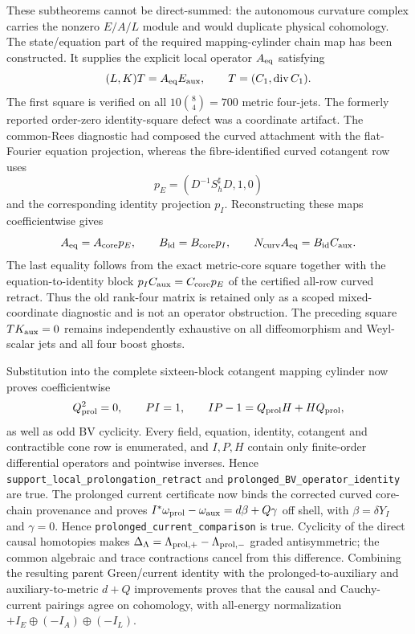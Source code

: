 \documentclass[11pt]{article}
\theoremstyle{definition}
\theoremstyle{remark}
\begin{document}
These subtheorems cannot be direct-summed: the autonomous curvature complex
carries the nonzero $E/A/L$ module and would duplicate physical cohomology.
The state/equation part of the required mapping-cylinder chain map has been
constructed.  It supplies the explicit local operator $A_{\rm eq}$ satisfying
\begin{equation}
 (L,K)T=A_{\rm eq}E_{\rm aux},\qquad
 T=(C_1,\operatorname{div}C_1).
\end{equation}
The first square is verified on all $10\binom{8}{4}=700$ metric four-jets.
The formerly reported order-zero identity-square defect was a coordinate
artifact.  The common-Rees diagnostic had composed the curved attachment with
the flat-Fourier equation projection, whereas the fibre-identified curved
cotangent row uses
\begin{equation}
 p_E=(D^{-1}S_h^\sharp D,1,0)
\end{equation}
and the corresponding identity projection $p_I$.  Reconstructing these maps
coefficientwise gives
\begin{equation}
 A_{\rm eq}=A_{\rm core}p_E,
 \qquad B_{\rm id}=B_{\rm core}p_I,
 \qquad N_{\rm curv}A_{\rm eq}=B_{\rm id}C_{\rm aux}.
\end{equation}
The last equality follows from the exact metric-core square together with the
equation-to-identity block $p_IC_{\rm aux}=C_{\rm core}p_E$ of the certified
all-row curved retract.  Thus the old rank-four matrix is retained only as a
scoped mixed-coordinate diagnostic and is not an operator obstruction.  The
preceding square $TK_{\rm aux}=0$ remains independently exhaustive on all
diffeomorphism and Weyl-scalar jets and all four boost ghosts.

Substitution into the complete sixteen-block cotangent mapping cylinder now
proves coefficientwise
\begin{equation}
 Q_{\rm prol}^2=0,
 \qquad PI=1,
 \qquad IP-1=Q_{\rm prol}H+HQ_{\rm prol},
\end{equation}
as well as odd BV cyclicity.  Every field, equation, identity, cotangent and
contractible cone row is enumerated, and $I,P,H$ contain only finite-order
differential operators and pointwise inverses.  Hence
\texttt{support\_local\_prolongation\_retract} and
\texttt{prolonged\_BV\_operator\_identity} are true.  The prolonged current
certificate now binds the corrected curved core-chain provenance and proves
$I^*\omega_{\rm prol}-\omega_{\rm aux}=d\beta+Q\gamma$ off shell, with
$\beta=\delta Y_I$ and $\gamma=0$.  Hence
\texttt{prolonged\_current\_comparison} is true.  Cyclicity of the direct
causal homotopies makes
$\Delta_\Lambda=\Lambda_{{\rm prol},+}-\Lambda_{{\rm prol},-}$ graded
antisymmetric; the common algebraic and trace contractions cancel from this
difference.  Combining the resulting parent Green/current identity with the
prolonged-to-auxiliary and auxiliary-to-metric $d+Q$ improvements proves that
the causal and Cauchy-current pairings agree on cohomology, with all-energy
normalization $+I_E\oplus(-I_A)\oplus(-I_L)$.
\end{document}
